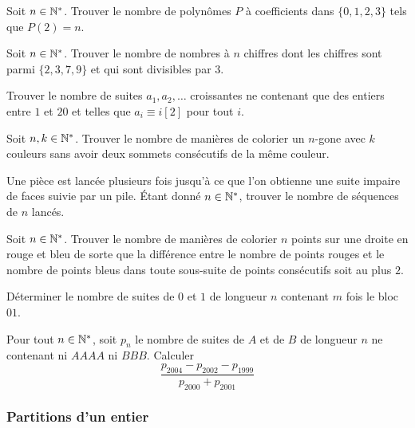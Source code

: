 \begin{exo}
Soit $n\in\mathbb N^*$. Trouver le nombre de polynômes $P$ à coefficients dans $\{0, 1, 2, 3\}$ tels que $P(2) = n$.
\end{exo}


\begin{exo}
Soit $n\in\mathbb N^*$. Trouver le nombre de nombres à $n$ chiffres dont les chiffres sont parmi $\{2,3,7,9\}$ et qui sont divisibles par $3$.
\end{exo}


\begin{exo}
Trouver le nombre de suites $a_1, a_2, \dots$ croissantes ne contenant que des entiers entre $1$ et $20$ et telles que $a_i\equiv i[2]$ pour tout $i$.
\end{exo}


\begin{exo}
Soit $n,k\in\mathbb N^*$. Trouver le nombre de manières de colorier un $n$-gone avec $k$ couleurs sans avoir deux sommets consécutifs de la même couleur.
\end{exo}


\begin{exo}
Une pièce est lancée plusieurs fois jusqu'à ce que l'on obtienne une suite impaire de faces suivie par un pile. Étant donné $n\in\mathbb N^*$, trouver le nombre de séquences de $n$ lancés.
\end{exo}


\begin{exo}
Soit $n\in\mathbb N^*$. Trouver le nombre de manières de colorier $n$ points sur une droite en rouge et bleu de sorte que la différence entre le nombre de points rouges et le nombre de points bleus dans toute sous-suite de points consécutifs soit au plus $2$.
\end{exo}


\begin{exo}
Déterminer le nombre de suites de $0$ et $1$ de longueur $n$ contenant $m$ fois le bloc $01$.
\end{exo}


\begin{exo}
Pour tout $n\in\mathbb N^*$, soit $p_n$ le nombre de suites de $A$ et de $B$ de longueur $n$ ne contenant ni $AAAA$ ni $BBB$. Calculer
$$\frac{p_{2004}-p_{2002}-p_{1999}}{p_{2000}+p_{2001}}$$
\end{exo}


\subsubsection{Partitions d'un entier}


